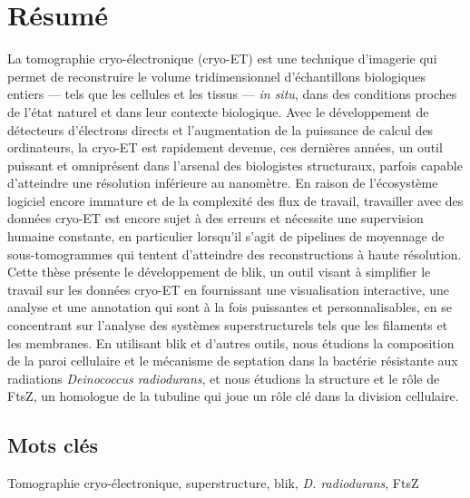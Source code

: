 \section*{Résumé} %
La tomographie cryo-électronique (cryo-ET) est une technique d'imagerie qui permet de reconstruire le volume tridimensionnel d'échantillons biologiques entiers --- tels que les cellules et les tissus --- \textit{in situ}, dans des conditions proches de l'état naturel et dans leur contexte biologique.
Avec le développement de détecteurs d'électrons directs et l'augmentation de la puissance de calcul des ordinateurs, la cryo-ET est rapidement devenue, ces dernières années, un outil puissant et omniprésent dans l'arsenal des biologistes structuraux, parfois capable d'atteindre une résolution inférieure au nanomètre.
En raison de l'écosystème logiciel encore immature et de la complexité des flux de travail, travailler avec des données cryo-ET est encore sujet à des erreurs et nécessite une supervision humaine constante, en particulier lorsqu'il s'agit de pipelines de moyennage de sous-tomogrammes qui tentent d'atteindre des reconstructions à haute résolution.
Cette thèse présente le développement de blik, un outil visant à simplifier le travail sur les données cryo-ET en fournissant une visualisation interactive, une analyse et une annotation qui sont à la fois puissantes et personnalisables, en se concentrant sur l'analyse des systèmes superstructurels tels que les filaments et les membranes.
En utilisant blik et d'autres outils, nous étudions la composition de la paroi cellulaire et le mécanisme de septation dans la bactérie résistante aux radiations \textit{Deinococcus radiodurans}, et nous étudions la structure et le rôle de FtsZ, un homologue de la tubuline qui joue un rôle clé dans la division cellulaire.

\subsection*{Mots clés}
Tomographie cryo-électronique, superstructure, blik, \textit{D. radiodurans}, FtsZ
